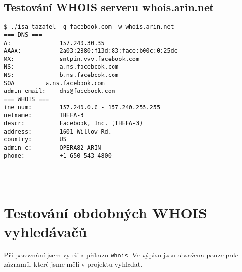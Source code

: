 \documentclass[a4paper, 11pt]{article}
\begin{document}
\subsection{Testování WHOIS serveru whois.arin.net}
\begin{lstlisting}
$ ./isa-tazatel -q facebook.com -w whois.arin.net
=== DNS ===
A:              157.240.30.35
AAAA:           2a03:2880:f13d:83:face:b00c:0:25de
MX:             smtpin.vvv.facebook.com
NS:         	a.ns.facebook.com
NS:         	b.ns.facebook.com
SOA:     	a.ns.facebook.com
admin email:    dns@facebook.com
=== WHOIS ===
inetnum:        157.240.0.0 - 157.240.255.255
netname:        THEFA-3
descr:          Facebook, Inc. (THEFA-3)
address:        1601 Willow Rd.
country:        US
admin-c:        OPERA82-ARIN
phone:          +1-650-543-4800




\end{lstlisting}

\section{Testování obdobných WHOIS vyhledávačů}
Při porovnání jsem využila příkazu \verb|whois|. Ve výpisu jsou obsažena pouze pole záznamů, které jsme měli v projektu vyhledat.
\end{document}
